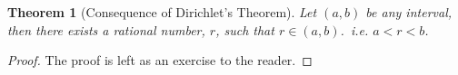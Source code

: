 \documentclass[12pt,reqno]{amsart}
\theoremstyle{plain}
\newtheorem{theorem}{Theorem}
\begin{document}
\begin{theorem}[Consequence of Dirichlet's Theorem]
    Let ${(a,b)}$ be any interval, then there exists a rational number, $r$, such that $r \in {(a,b)}$.\  i.e. $a < r < b$.
\end{theorem}
\begin{proof}
    The proof is left as an exercise to the reader.
\end{proof}
\end{document}
